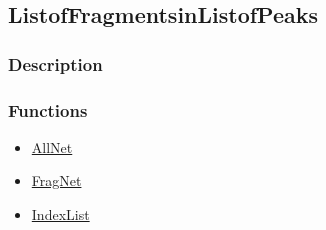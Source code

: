 \subsection{ListofFragmentsinListofPeaks}\label{ListofFragmentsinListofPeaks}
\subsubsection{Description}


\subsubsection{Functions}
\begin{itemize}
\item \hyperref[AllNet]{AllNet}
\item \hyperref[FragNet]{FragNet}	
\item \hyperref[IndexList]{IndexList}	
\end{itemize}

